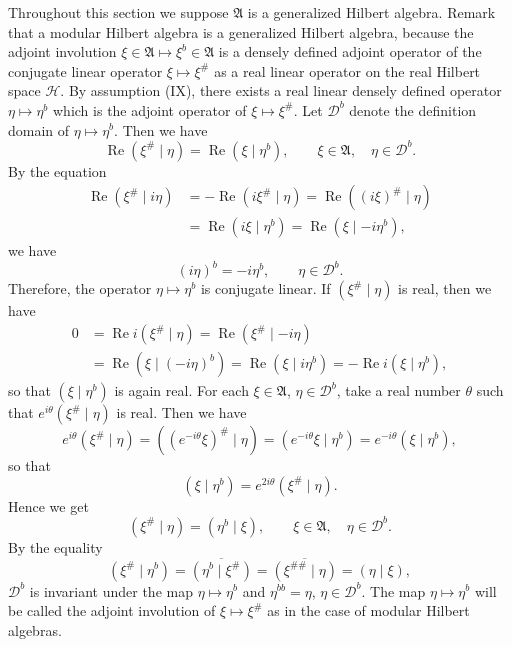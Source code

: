 \documentclass[12pt,b5paper,twoside]{article}
\theoremstyle{takesaki}
\numberwithin{equation}{section}
\begin{document}
Throughout this section we suppose $\mathfrak A$ is a generalized
Hilbert algebra.  Remark that a modular Hilbert algebra is a generalized
Hilbert algebra, because the adjoint involution
$\xi\in\mathfrak A\mapsto\xi^b\in\mathfrak A$ is a densely defined
adjoint operator of the conjugate linear operator
$\xi\mapsto\xi^\#$ as a real linear operator on the real Hilbert space
$\mathcal H$.  By assumption (IX), there exists a real linear densely
defined operator $\eta\mapsto\eta^b$ which is the adjoint operator of
$\xi\mapsto\xi^\#$.  Let $\mathcal D^b$ denote the definition domain of
$\eta\mapsto\eta^b$.  Then we have
\[
  \operatorname{Re}(\xi^\#\mid\eta)
   =\operatorname{Re}(\xi\mid\eta^b),
  \qquad \xi\in\mathfrak A,\quad\eta\in\mathcal D^b.
\]
By the equation
\begin{align*}
  \operatorname{Re}(\xi^\#\mid i\eta)
    &=-\operatorname{Re}(i\xi^\#\mid\eta)
      =\operatorname{Re}((i\xi)^\#\mid\eta)\\
    &=\operatorname{Re}(i\xi\mid\eta^b)
      =\operatorname{Re}(\xi\mid-i\eta^b),
\end{align*}
we have
\[
  (i\eta)^b=-i\eta^b,\qquad \eta\in\mathcal D^b.
\]
Therefore, the operator $\eta\mapsto\eta^b$ is conjugate linear.  If
$(\xi^\#\mid\eta)$ is real, then we have
\begin{align*}
  0&=\operatorname{Re}i(\xi^\#\mid\eta)
     =\operatorname{Re}(\xi^\#\mid-i\eta)\\
   &=\operatorname{Re}(\xi\mid(-i\eta)^b)
     =\operatorname{Re}(\xi\mid i\eta^b)
     =-\operatorname{Re}i(\xi\mid\eta^b),
\end{align*}
so that $(\xi\mid\eta^b)$ is again real.  For each
$\xi\in\mathfrak A$, $\eta\in\mathcal D^b$, take a real number $\theta$
such that $e^{i\theta}(\xi^\#\mid\eta)$ is real.  Then we have
\[
  e^{i\theta}(\xi^\#\mid\eta)
    =((e^{-i\theta}\xi)^\#\mid\eta)
    =(e^{-i\theta}\xi\mid\eta^b)
    =e^{-i\theta}(\xi\mid\eta^b),
\]
so that
\[
  (\xi\mid\eta^b)=e^{2i\theta}(\xi^\#\mid\eta).
\]
Hence we get
\begin{equation}
  (\xi^\#\mid\eta)=(\eta^b\mid\xi),
  \qquad \xi\in\mathfrak A,\quad\eta\in\mathcal D^b.
  \tag{3.1}\label{eq:3.1}
\end{equation}
By the equality
\[
  (\xi^\#\mid\eta^b)
   =\overline{(\eta^b\mid\xi^\#)}
   =\overline{(\xi^{\#\#}\mid\eta)}
   =(\eta\mid\xi),
\]
$\mathcal D^b$ is invariant under the map $\eta\mapsto\eta^b$ and
$\eta^{bb}=\eta$, $\eta\in\mathcal D^b$.  The map
$\eta\mapsto\eta^b$ will be called the adjoint involution of
$\xi\mapsto\xi^\#$ as in the case of modular Hilbert algebras.
\end{document}

